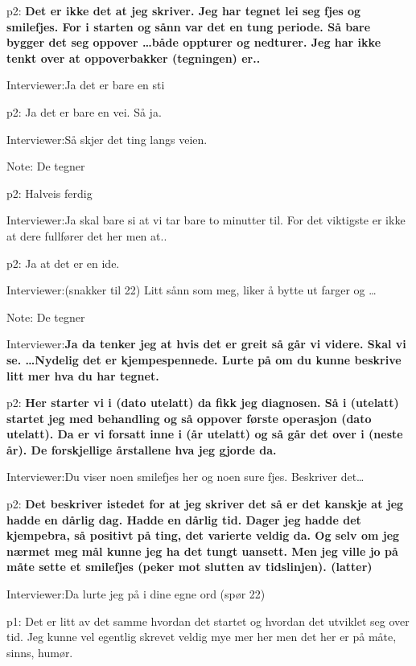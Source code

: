 \documentclass[11pt, norsk, a4paper]{article}
\begin{document}
\textcolor{myYellow} {p2:} \textbf{Det er ikke det at jeg skriver. Jeg har tegnet lei seg fjes og smilefjes. For i starten og sånn var det en tung periode. Så bare bygger det seg oppover \dots både oppturer og nedturer. Jeg har ikke tenkt over at oppoverbakker (tegningen) er..}

\textcolor{myBlue} {Interviewer:}Ja det er bare en sti

\textcolor{myYellow} {p2:} Ja det er bare en vei. Så ja.

\textcolor{myBlue} {Interviewer:}Så skjer det ting langs veien.

\textcolor{myGrey}{Note:} De tegner

\textcolor{myYellow} {p2:} Halveis ferdig

\textcolor{myBlue} {Interviewer:}Ja skal bare si at vi tar bare to minutter til. For det viktigste er ikke at dere fullfører det her men at..

\textcolor{myYellow} {p2:} Ja at det er en ide.

\textcolor{myBlue} {Interviewer:}(snakker til 22) Litt sånn som meg, liker å bytte ut farger og \dots

\textcolor{myGrey}{Note:} De tegner

\textcolor{myBlue} {Interviewer:}\textbf{Ja da tenker jeg at hvis det er greit så går vi videre. Skal vi se. \dots Nydelig det er kjempespennede. Lurte på om du kunne beskrive litt mer hva du har tegnet.}

\textcolor{myYellow} {p2:} \textbf{Her starter vi i (dato utelatt) da fikk jeg diagnosen. Så i (utelatt) startet jeg med behandling og så oppover første operasjon (dato utelatt). Da er vi forsatt inne i (år utelatt) og så går det over i (neste år). De forskjellige årstallene hva jeg gjorde da.}

\textcolor{myBlue} {Interviewer:}Du viser noen smilefjes her og noen sure fjes. Beskriver det\dots

\textcolor{myYellow} {p2:} \textbf{Det beskriver istedet for at jeg skriver det så er det kanskje at jeg hadde en dårlig dag. Hadde en dårlig tid. Dager jeg hadde det kjempebra, så positivt på ting, det varierte veldig da. Og selv om jeg nærmet meg mål kunne jeg ha det tungt uansett. Men jeg ville jo på måte sette et smilefjes (peker mot slutten av tidslinjen). (latter)}

\textcolor{myBlue} {Interviewer:}Da lurte jeg på i dine egne ord (spør 22)

\textcolor{myGreen} {p1:} Det er litt av det samme hvordan det startet og hvordan det utviklet seg over tid. Jeg kunne vel egentlig skrevet veldig mye mer her men det her er på måte, sinns, humør.
\end{document}
